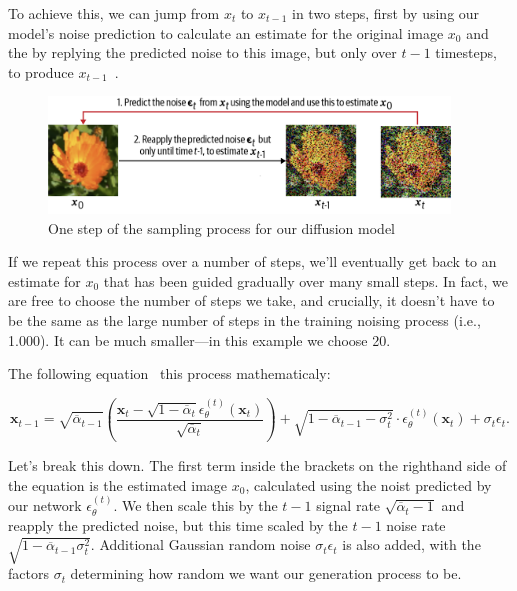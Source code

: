 To achieve this, we can jump from \( x_t \) to \( x_{t-1} \) in two steps, first by using our model's noise prediction to calculate an estimate for the original image \( x_{0} \) and the by replying the predicted noise to this image, but only over \( t-1 \) timesteps, to produce \( x_{t-1} \)~.

\begin{figure}
	\begin{center}
		\includegraphics[width=0.95\textwidth]{figures/one_step_difussion_model}
	\end{center}
	\caption{One step of the sampling process for our diffusion model~\cite{foster2022generative}}\label{fig:one_step_difussion_model}
\end{figure}

If we repeat this process over a number of steps, we’ll eventually get back to an estimate for \( x_{0} \) that has been guided gradually over many small steps.
In fact, we are free to choose the number of steps we take, and crucially, it doesn’t have to be the same as the large number of steps in the training noising process (i.e., \num{1,000}).
It can be much smaller—in this example we choose \num{20}.

The following equation~\cite{song2022denoising} this process mathematicaly:

\[
	\mathbf{x}_{t-1} = \sqrt{\overline{\alpha}_{t-1}} \left(\frac{\mathbf{x}_t - \sqrt{1- \overline{\alpha }_t} \epsilon ^{(t)}_\theta\left(\mathbf{x}_t\right)  }{\sqrt{\overline{\alpha }_t} }\right) + \sqrt{1 - \overline{\alpha }_{t-1} - \sigma ^2_t } \cdot \epsilon ^{(t)}  _\theta \left(\mathbf{x}_t\right) + \sigma _t \epsilon_t
	.\]

Let's break this down.
The first term inside the brackets on the righthand side of the equation is the estimated image \( x_{0} \), calculated using the noist predicted by our network \( \epsilon ^{(t)} _\theta \).
We then scale this by the \( t-1 \) signal rate \( \sqrt{\overline{\alpha}_t - 1} \) and reapply the predicted noise, but this time scaled by the \( t - 1 \) noise rate \( \sqrt{1 - \overline{\alpha}_{t-1}  \sigma ^2 _t } \).
Additional Gaussian random noise \( \sigma _t \epsilon_t \) is also added, with the factors \( \sigma _t \) determining how random we want our generation process to be.

